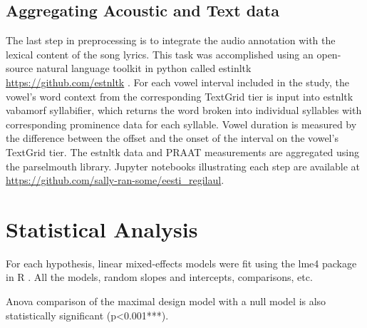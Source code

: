 

\subsection{Aggregating Acoustic and Text data}

The last step in preprocessing is to integrate the audio annotation with the lexical content of the song lyrics. This task was accomplished using an open-source natural language toolkit in python called estinltk \url{https://github.com/estnltk} \citep{estnltk2020}. For each vowel interval included  in the study, the vowel's word context from the corresponding TextGrid tier is input into estnltk vabamorf syllabifier, which returns the word broken into individual syllables with corresponding prominence data for each syllable. Vowel duration is measured by the difference between the offset and the onset of the interval on the vowel's TextGrid tier. The estnltk data and PRAAT measurements are aggregated using the parselmouth library\citep{parselmouth2018, python1995}. Jupyter notebooks illustrating each step are available at  \url{https://github.com/sally-ran-some/eesti_regilaul}. 





\section{Statistical Analysis} 
For each hypothesis, linear mixed-effects models were fit using the lme4 package in R \citep{lme4,r2022}. All the models, random slopes and intercepts, comparisons, etc. 


Anova comparison of the maximal design model with a null model is also statistically significant (p<0.001***). 
